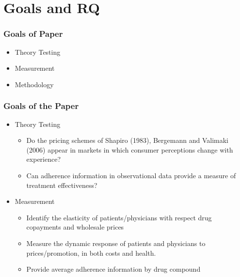 \documentclass[xcolor=pdftex,dvipsnames,table,mathserif,aspectratio=169]{beamer}
\begin{document}

\section{Goals and RQ}


\begin{frame}
\frametitle{Goals of Paper}

\begin{itemize}
\item Theory Testing

\item Measurement

\item Methodology
\end{itemize}
\end{frame}


\begin{frame}
\frametitle{Goals of the Paper}

\begin{itemize}
\item Theory Testing

\begin{itemize}
\item Do the pricing schemes of Shapiro (1983), Bergemann and Valimaki
(2006) appear in markets in which consumer perceptions change with
experience?

\item Can adherence information in observational data provide a measure of
treatment effectiveness?
\end{itemize}

\item Measurement

\begin{itemize}
\item Identify the elasticity of patients/physicians with respect drug
copayments and wholesale prices

\item Measure the dynamic response of patients and physicians to
prices/promotion, in both costs and health.

\item Provide average adherence information by drug compound
\end{itemize}
\end{itemize}
\end{frame}
\end{document}
